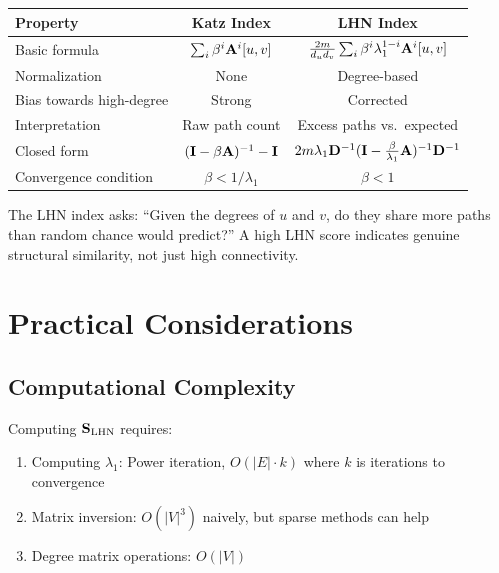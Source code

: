 \begin{notechapter}
\begin{center}
\begin{tabular}{@{}lcc@{}}
\toprule
\textbf{Property} & \textbf{Katz Index} & \textbf{LHN Index} \\
\midrule
Basic formula & $\sum_i \beta^i \mathbf{A}^i[u,v]$ & $\frac{2m}{d_u d_v}\sum_i \beta^i \lambda_1^{1-i} \mathbf{A}^i[u,v]$ \\[1em]
Normalization & None & Degree-based \\[0.5em]
Bias towards high-degree & Strong & Corrected \\[0.5em]
Interpretation & Raw path count & Excess paths vs.\ expected \\[0.5em]
Closed form & $(\mathbf{I} - \beta\mathbf{A})^{-1} - \mathbf{I}$ & $2m\lambda_1 \mathbf{D}^{-1}(\mathbf{I} - \frac{\beta}{\lambda_1}\mathbf{A})^{-1}\mathbf{D}^{-1}$ \\[0.5em]
Convergence condition & $\beta < 1/\lambda_1$ & $\beta < 1$ \\
\bottomrule
\end{tabular}
\end{center}

\begin{keyidea}
The LHN index asks: ``Given the degrees of $u$ and $v$, do they share more paths than random chance would predict?'' A high LHN score indicates genuine structural similarity, not just high connectivity.
\end{keyidea}

\section{Practical Considerations}

\subsection{Computational Complexity}

Computing $\mathbf{S}_{\text{LHN}}$ requires:
\begin{enumerate}
    \item Computing $\lambda_1$: Power iteration, $O(|E| \cdot k)$ where $k$ is iterations to convergence
    \item Matrix inversion: $O(|V|^3)$ naively, but sparse methods can help
    \item Degree matrix operations: $O(|V|)$
\end{enumerate}


\end{notechapter}
